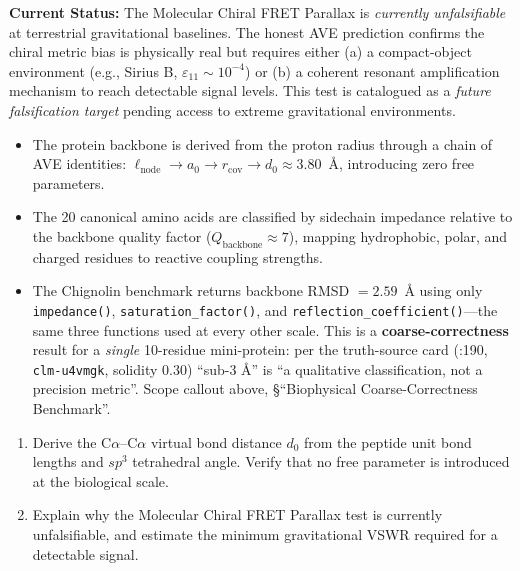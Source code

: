 \textbf{Current Status:} The Molecular Chiral FRET Parallax is \textit{currently unfalsifiable} at terrestrial gravitational baselines. The honest AVE prediction confirms the chiral metric bias is physically real but requires either (a) a compact-object environment (e.g., Sirius B, $\varepsilon_{11} \sim 10^{-4}$) or (b) a coherent resonant amplification mechanism to reach detectable signal levels. This test is catalogued as a \textit{future falsification target} pending access to extreme gravitational environments.

\begin{summarybox}
\begin{itemize}
    \item The protein backbone is derived from the proton radius through a chain of AVE identities: $\ell_{\text{node}} \to a_0 \to r_{\text{cov}} \to d_0 \approx 3.80$~\AA, introducing zero free parameters.
    \item The 20 canonical amino acids are classified by sidechain impedance relative to the backbone quality factor ($Q_{\text{backbone}} \approx 7$), mapping hydrophobic, polar, and charged residues to reactive coupling strengths.
    \item The Chignolin benchmark returns backbone RMSD $= 2.59$~\AA{} using only \texttt{impedance()}, \texttt{saturation\_factor()}, and \texttt{reflection\_coefficient()}---the same three functions used at every other scale. This is a \textbf{coarse-correctness} result for a \emph{single} 10-residue mini-protein: per the truth-source card (:190, \texttt{clm-u4vmgk}, solidity 0.30) ``sub-3 \AA'' is ``a qualitative classification, not a precision metric''. Scope callout above, \S``Biophysical Coarse-Correctness Benchmark''.
\end{itemize}
\end{summarybox}

\begin{exercisebox}
\begin{enumerate}
    \item Derive the C$\alpha$--C$\alpha$ virtual bond distance $d_0$ from the peptide unit bond lengths and $sp^3$ tetrahedral angle. Verify that no free parameter is introduced at the biological scale.
    \item Explain why the Molecular Chiral FRET Parallax test is currently unfalsifiable, and estimate the minimum gravitational VSWR required for a detectable signal.
\end{enumerate}
\end{exercisebox}

